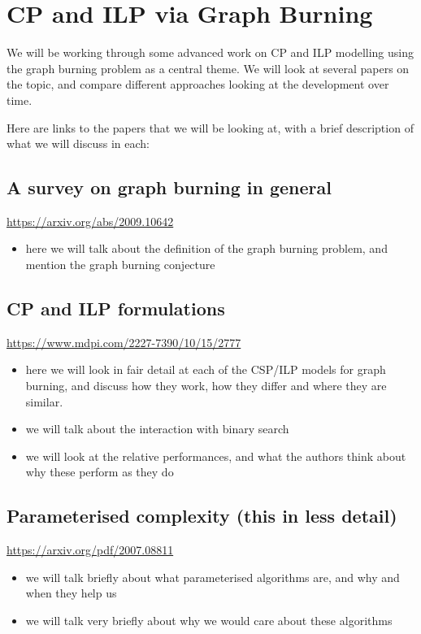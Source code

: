 \documentclass[11pt]{article}
\begin{document}
\section{CP and ILP via Graph Burning}

We will be working through some advanced work on CP and ILP modelling using the graph burning problem as a central theme. We will look at several papers on the topic, and compare different approaches looking at the development over time.

Here are links to the papers that we will be looking at, with a brief description of what we will discuss in each:

\subsection{A survey on graph burning in general}
\url{https://arxiv.org/abs/2009.10642}
\begin{itemize}
    \item here we will talk about the definition of the graph burning problem, and mention the graph burning conjecture
\end{itemize}

\subsection{CP and ILP formulations}
\url{https://www.mdpi.com/2227-7390/10/15/2777}
\begin{itemize}
    \item here we will look in fair detail at each of the CSP/ILP models for graph burning, and discuss how they work, how they differ and where they are similar.
    \item we will talk about the interaction with binary search
    \item we will look at the relative performances, and what the authors think about why these perform as they do
\end{itemize}

\subsection{Parameterised complexity (this in less detail)}
\url{https://arxiv.org/pdf/2007.08811}
\begin{itemize}
    \item we will talk briefly about what parameterised algorithms are, and why and when they help us
    \item we will talk very briefly about why we would care about these algorithms
\end{itemize}
\end{document}
